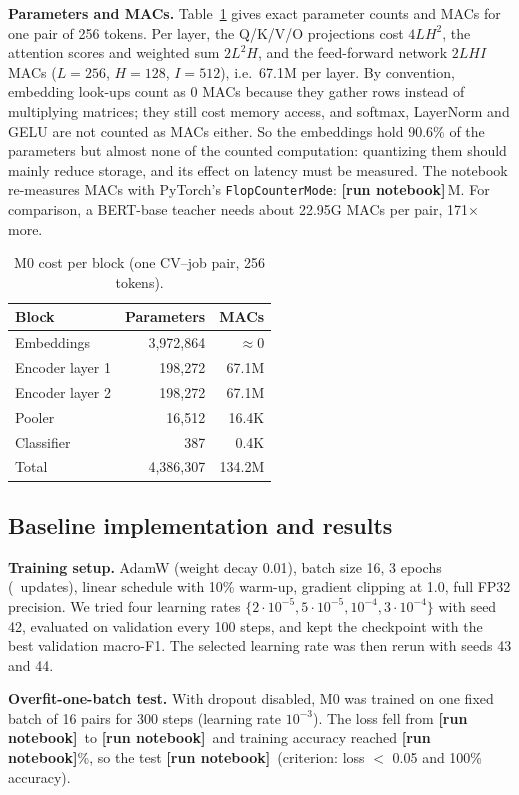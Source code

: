 \documentclass[11pt]{article}
\newcommand{\RUN}{\textbf{[run notebook]}}
\newcommand{\OverfitFirst}{\RUN}\newcommand{\OverfitFinal}{\RUN}\newcommand{\OverfitAcc}{\RUN}\newcommand{\OverfitPassed}{\RUN}
\newcommand{\MzeroMACsM}{\RUN}\newcommand{\MzeroLayerMACsM}{\RUN}\newcommand{\MzeroMACsAnalyticM}{134.2}
\begin{document}
\textbf{Parameters and MACs.} Table~\ref{tab:cost} gives exact parameter counts and MACs for one pair of 256 tokens. Per layer, the Q/K/V/O projections cost $4LH^2$, the attention scores and weighted sum $2L^2H$, and the feed-forward network $2LHI$ MACs ($L{=}256$, $H{=}128$, $I{=}512$), i.e.\ 67.1M per layer. By convention, embedding look-ups count as 0 MACs because they gather rows instead of multiplying matrices; they still cost memory access, and softmax, LayerNorm and GELU are not counted as MACs either. So the embeddings hold 90.6\% of the parameters but almost none of the counted computation: quantizing them should mainly reduce storage, and its effect on latency must be measured. The notebook re-measures MACs with PyTorch's \texttt{FlopCounterMode}: \MzeroMACsM\,M. For comparison, a BERT-base teacher needs about 22.95G MACs per pair, 171$\times$ more.

\begin{table}[t]
\centering\small
\begin{tabular}{@{}lrr@{}}
\toprule
Block & Parameters & MACs \\
\midrule
Embeddings & 3,972,864 & $\approx$0 \\
Encoder layer 1 & 198,272 & 67.1M \\
Encoder layer 2 & 198,272 & 67.1M \\
Pooler & 16,512 & 16.4K \\
Classifier & 387 & 0.4K \\
\midrule
Total & 4,386,307 & 134.2M \\
\bottomrule
\end{tabular}
\caption{M0 cost per block (one CV--job pair, 256 tokens).}
\label{tab:cost}
\end{table}

\subsection{Baseline implementation and results}
\textbf{Training setup.} AdamW (weight decay 0.01), batch size 16, 3 epochs (\MzeroSteps\ updates), linear schedule with 10\% warm-up, gradient clipping at 1.0, full FP32 precision. We tried four learning rates $\{2\cdot10^{-5}, 5\cdot10^{-5}, 10^{-4}, 3\cdot10^{-4}\}$ with seed 42, evaluated on validation every 100 steps, and kept the checkpoint with the best validation macro-F1. The selected learning rate was then rerun with seeds 43 and 44.

\textbf{Overfit-one-batch test.} With dropout disabled, M0 was trained on one fixed batch of 16 pairs for 300 steps (learning rate $10^{-3}$). The loss fell from \OverfitFirst\ to \OverfitFinal\ and training accuracy reached \OverfitAcc\%, so the test \OverfitPassed\ (criterion: loss $<$ 0.05 and 100\% accuracy).
\end{document}
